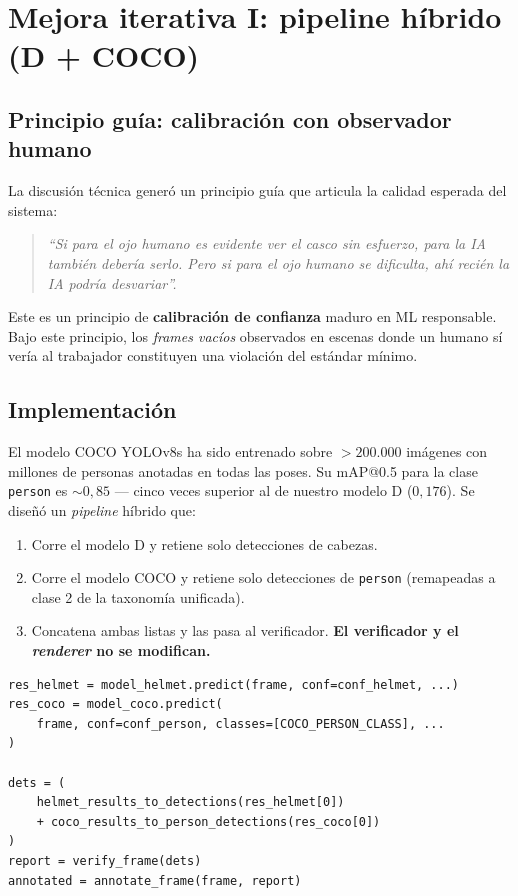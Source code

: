 \documentclass[journal,onecolumn,11pt]{IEEEtran}
\begin{document}
\section{Mejora iterativa I: pipeline híbrido (D + COCO)}

\subsection{Principio guía: calibración con observador humano}

La discusión técnica generó un principio guía que articula la
calidad esperada del sistema:

\begin{quotation}
\textit{``Si para el ojo humano es evidente ver el casco sin
esfuerzo, para la IA también debería serlo. Pero si para el ojo
humano se dificulta, ahí recién la IA podría desvariar''.}
\end{quotation}

Este es un principio de \textbf{calibración de confianza} maduro en
ML responsable. Bajo este principio, los \textit{frames vacíos}
observados en escenas donde un humano sí vería al trabajador
constituyen una violación del estándar mínimo.

\subsection{Implementación}

El modelo COCO YOLOv8s ha sido entrenado sobre $>200.000$ imágenes
\cite{cocometrics} con millones de personas anotadas en todas las
poses. Su mAP@0.5 para la clase \texttt{person} es $\sim 0{,}85$ —
cinco veces superior al de nuestro modelo D ($0{,}176$). Se diseñó
un \textit{pipeline} híbrido que:

\begin{enumerate}[leftmargin=*]
    \item Corre el modelo D y retiene solo detecciones de cabezas.
    \item Corre el modelo COCO y retiene solo detecciones de
    \texttt{person} (remapeadas a clase 2 de la taxonomía
    unificada).
    \item Concatena ambas listas y las pasa al verificador. \textbf{El
    verificador y el \textit{renderer} no se modifican.}
\end{enumerate}

\begin{lstlisting}[caption={Núcleo del \textit{pipeline} híbrido
(\texttt{src/run\_video\_hybrid.py}).}]
res_helmet = model_helmet.predict(frame, conf=conf_helmet, ...)
res_coco = model_coco.predict(
    frame, conf=conf_person, classes=[COCO_PERSON_CLASS], ...
)

dets = (
    helmet_results_to_detections(res_helmet[0])
    + coco_results_to_person_detections(res_coco[0])
)
report = verify_frame(dets)
annotated = annotate_frame(frame, report)
\end{lstlisting}
\end{document}
